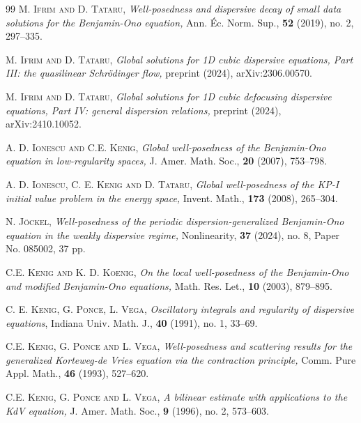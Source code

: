 \documentclass{amsart}
\theoremstyle{definition}
\theoremstyle{remark}
\numberwithin{equation}{section}
\begin{document}
\begin{thebibliography}{99}
\newblock \textsc{M. Ifrim and D. Tataru,}
\newblock \emph{Well-posedness and dispersive decay of small data solutions for the Benjamin-Ono equation,}
\newblock Ann. \'Ec. Norm. Sup., {\bf 52} (2019), no. 2, 297--335.

\newblock \textsc{M. Ifrim and D. Tataru,}
\newblock \emph{Global solutions for 1D cubic dispersive equations, Part III: the quasilinear Schrödinger flow,}
\newblock preprint (2024), arXiv:2306.00570.

\newblock \textsc{M. Ifrim and D. Tataru,}
\newblock \emph{Global solutions for 1D cubic defocusing dispersive equations, Part IV: general dispersion relations,}
\newblock preprint (2024), arXiv:2410.10052.


\newblock \textsc{A. D. Ionescu and C.E. Kenig,}
\newblock \emph{Global well-posedness of the Benjamin-Ono equation in low-regularity spaces,}
\newblock  J. Amer. Math. Soc., \textbf{20} (2007), 753--798.

\newblock \textsc{A. D. Ionescu, C. E. Kenig and D. Tataru,}
\newblock \emph{Global well-posedness of the KP-I initial value problem in the energy space,}
\newblock Invent. Math., \textbf{173} (2008), 265--304.


\newblock \textsc{N. J\"ockel,}
\newblock \emph{Well-posedness of the periodic dispersion-generalized Benjamin-Ono equation in the weakly dispersive regime,}
\newblock  Nonlinearity, {\bf 37} (2024), no. 8, Paper No. 085002, 37 pp.


\newblock \textsc{C.E. Kenig and K. D. Koenig,}
\newblock \emph{On the local well-posedness of the Benjamin-Ono and modified Benjamin-Ono equations,}
\newblock Math. Res. Let., \textbf{10} (2003), 879--895.


\textsc{C. E. Kenig, G. Ponce, L. Vega},  
\textit{Oscillatory integrals and regularity of dispersive equations}, 
Indiana Univ. Math. J., \textbf{40} (1991), no. 1, 33--69.

\newblock \textsc{C.E. Kenig, G. Ponce and L. Vega,}
\newblock \emph{Well-posedness and scattering results for the generalized Korteweg-de Vries equation via the contraction principle,}
\newblock Comm. Pure Appl. Math., \textbf{46} (1993), 527--620.

\newblock \textsc{C.E. Kenig, G. Ponce and L. Vega,}
\newblock \emph{ A bilinear estimate with applications to the KdV equation,}
\newblock J. Amer. Math. Soc., {\bf 9} (1996), no. 2, 573--603.


\end{thebibliography}
\end{document}

